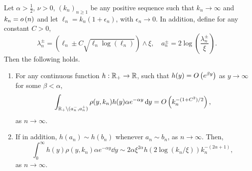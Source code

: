 \begin{lemma}\label{lem:concentration_argument}
Let $\alpha > \frac{1}{2}$, $\nu > 0$, $(k_n)_{n \ge 1}$ be any positive sequence such that $k_n \to \infty$ and $k_n = o\left(n\right)$ and let $\ell_n = k_n(1 + \epsilon_n)$, with $\epsilon_n \to 0$. In addition, define for any constant $C > 0$,
\[
	\lambda_n^\pm = (\ell_n \pm C \sqrt{\ell_n \log(\ell_n)}) \wedge \xi, 
	\quad a_n^\pm = 2 \log\left(\frac{\lambda_n^\pm}{\xi}\right).
\] 
Then the following holds.
\begin{enumerate}
\item For any continuous function $h : {\mathbb R}_+ \rightarrow  {\ensuremath{\mathbb R}}$, such that $h(y) = O\left(e^{\beta y}\right)$ as $y \to \infty$ for some $\beta < \alpha$, 
\begin{equation}\label{eq:error_bound_int_rho_not_K}
	\int_{{\mathbb R}_+ \setminus (a_n^-, a_n^+)} \rho(y,k_n) h(y) \alpha e^{-\alpha y} \operatorname{\mathrm{d}\hspace{-2pt}} y
	= O\left(k_n^{-(1+C^2)/2}\right),
\end{equation}
as $n \to \infty$.
\item If in addition, $h(a_n) \sim h(b_n)$ whenever $a_n \sim b_n$, as $n \to \infty$. Then,
\begin{equation}\label{eq:concentration_h_rho}
	\int_0^\infty h(y) \rho(y,k_n) \alpha e^{-\alpha y} \dd y \sim  
		2\alpha \xi^{2\alpha} h(2\log(k_n/\xi)) k_n^{-(2\alpha + 1)},
\end{equation}
as $n \to \infty$.
\end{enumerate}
\end{lemma}


